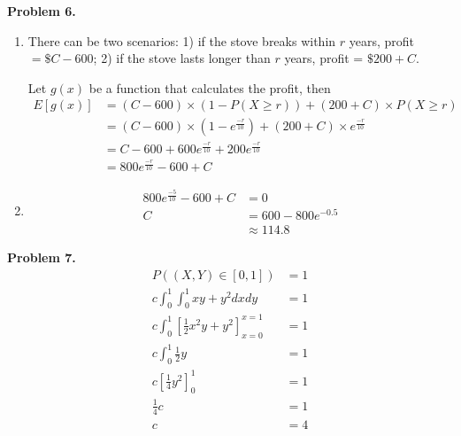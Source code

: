 \documentclass{article}
\begin{document}
\textbf{Problem 6.}
\begin{enumerate}[label={(\alph*)}]
    \item There can be two scenarios: 1) if the stove breaks within $r$ years, profit $ = \$C-600$; 2) if the stove lasts longer than $r$ years, profit = $\$200+C$.
    
    Let $g(x)$ be a function that calculates the profit, then 
    \begin{align}
        E[g(x)] & = (C-600) \times \left(1-P(X \ge r)\right)+(200+C)\times P(X\ge r) \\
        & = (C-600) \times (1 - e^{\frac{-r}{10}})+(200+C)\times e^{\frac{-r}{10}} \\
        & = C-600+600e^{\frac{-r}{10}}+200e^{\frac{-r}{10}} \\
        & = 800e^{\frac{-r}{10}}-600+C
    \end{align}

    \item 
    \begin{align}
        800e^{\frac{-5}{10}}-600+C & = 0 \\
        C & = 600 - 800e^{-0.5} \\
        & \approx 114.8
    \end{align}
\end{enumerate}
\bigbreak

\textbf{Problem 7.}
\begin{align}
    P((X,Y)\in [0,1])&=1 \\
    c\int_{0}^{1}\int_{0}^{1}xy+y^2dxdy & = 1 \\
    c\int_{0}^{1}\left[\frac{1}{2}x^2y+y^2\right]_{x=0}^{x=1} & = 1 \\
    c\int_{0}^{1}\frac{1}{2}y& = 1 \\
    c\left[\frac{1}{4}y^2\right]_0^1 & = 1 \\
    \frac{1}{4}c & = 1 \\
    c & = 4
\end{align}
\end{document}
